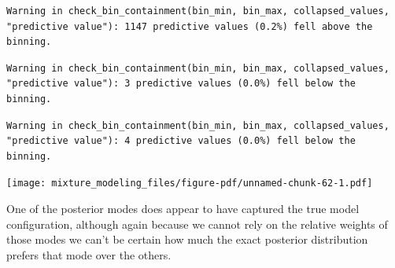 \documentclass[
  letterpaper,
  DIV=11,
  numbers=noendperiod]{scrartcl}
\newenvironment{Shaded}{\begin{snugshade}}{\end{snugshade}}
\newcommand{\AttributeTok}[1]{\textcolor[rgb]{0.40,0.45,0.13}{#1}}
\newcommand{\ControlFlowTok}[1]{\textcolor[rgb]{0.00,0.23,0.31}{#1}}
\newcommand{\DecValTok}[1]{\textcolor[rgb]{0.68,0.00,0.00}{#1}}
\newcommand{\FloatTok}[1]{\textcolor[rgb]{0.68,0.00,0.00}{#1}}
\newcommand{\FunctionTok}[1]{\textcolor[rgb]{0.28,0.35,0.67}{#1}}
\newcommand{\NormalTok}[1]{\textcolor[rgb]{0.00,0.23,0.31}{#1}}
\newcommand{\OtherTok}[1]{\textcolor[rgb]{0.00,0.23,0.31}{#1}}
\newcommand{\SpecialCharTok}[1]{\textcolor[rgb]{0.37,0.37,0.37}{#1}}
\newcommand{\StringTok}[1]{\textcolor[rgb]{0.13,0.47,0.30}{#1}}
\begin{document}
\begin{Shaded}
\end{Shaded}

\begin{verbatim}
Warning in check_bin_containment(bin_min, bin_max, collapsed_values,
"predictive value"): 1147 predictive values (0.2%) fell above the binning.
\end{verbatim}

\begin{verbatim}
Warning in check_bin_containment(bin_min, bin_max, collapsed_values,
"predictive value"): 3 predictive values (0.0%) fell below the binning.
\end{verbatim}

\begin{verbatim}
Warning in check_bin_containment(bin_min, bin_max, collapsed_values,
"predictive value"): 4 predictive values (0.0%) fell below the binning.
\end{verbatim}

\texttt{[image: mixture\_modeling\_files/figure-pdf/unnamed-chunk-62-1.pdf]}

One of the posterior modes does appear to have captured the true model
configuration, although again because we cannot rely on the relative
weights of those modes we can't be certain how much the exact posterior
distribution prefers that mode over the others.
\end{document}
